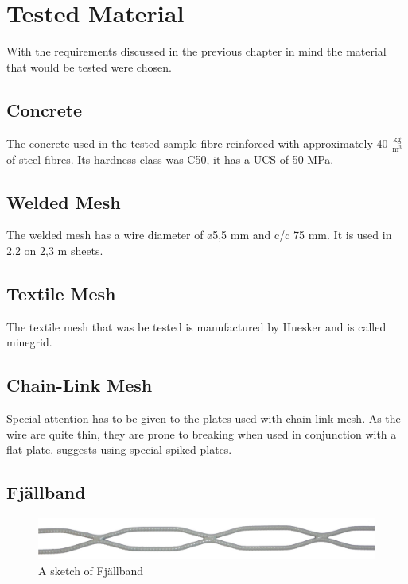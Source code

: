 \chapter{Tested Material}

With the requirements discussed in the previous chapter in mind the material that would be tested were chosen.

\section*{Concrete}
The concrete used in the tested sample %
fibre reinforced with approximately 40 \(\frac{\text{kg}}{\text{m}^3}\) of steel fibres. Its hardness class was C50, it has a UCS of 50 MPa.



\section*{Welded Mesh}
The welded mesh has a wire diameter of \o 5,5 mm and c/c 75 mm. It is used in 2,2 on 2,3 m sheets. 

\section*{Textile Mesh}
The textile mesh that was be tested is manufactured by Huesker and is called minegrid. 

\section*{Chain-Link Mesh}

Special attention has to be given to the plates used with chain-link mesh. As the wire are quite thin, they are prone to breaking when used in conjunction with a flat plate. \textcite{chainlink11} suggests using special spiked plates.

\section*{Fjällband}
\label{sec:fjäll}

\begin{figure}
    \centering
    \includegraphics[width=0.95\linewidth]{pics/Fjallband.jpg}
    \caption{A sketch of Fjällband}
    \label{fig:fjäll}
\end{figure}

